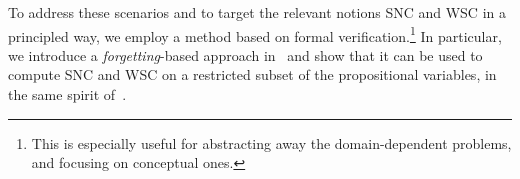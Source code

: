 \documentclass{article}
\begin{document}








 To address these scenarios and to target the relevant notions SNC and WSC in a principled way, we employ a  method based on formal verification.\footnote{ This is  especially useful for abstracting away the domain-dependent problems, and focusing on conceptual ones.} In particular,
we introduce a \emph{forgetting}-based approach in \CTL\, and show that it can
be used to compute SNC and WSC on a restricted subset of the propositional variables, in the same spirit of~\cite{DBLP:Lin:AIJ:2001,doherty2001computing}.
\end{document}

